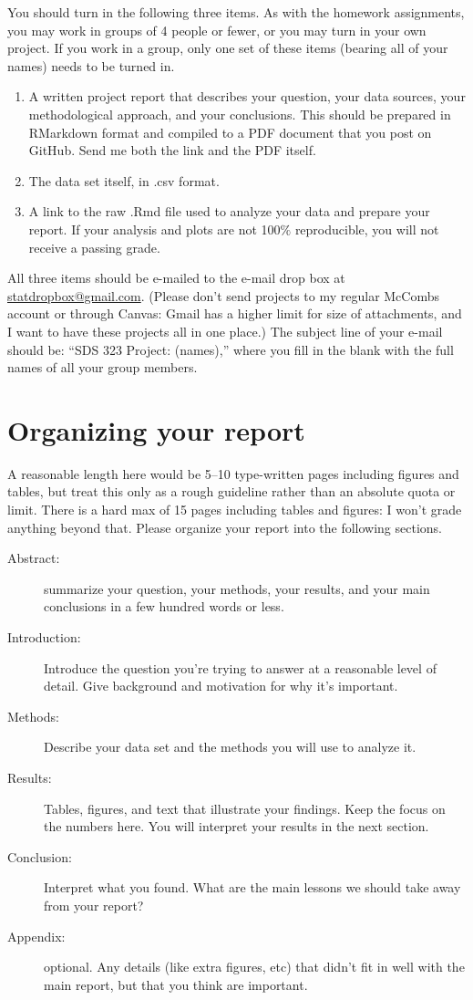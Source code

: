 \documentclass{mynotes}
\begin{document}
You should turn in the following three items.  As with the homework assignments, you may work in groups of 4 people or fewer, or you may turn in your own project.  If you work in a group, only one set of these items (bearing all of your names) needs to be turned in.
\begin{enumerate}
\item A written project report that describes your question, your data sources, your methodological approach, and your conclusions.  This should be prepared in RMarkdown format and compiled to a PDF document that you post on GitHub.  Send me both the link and the PDF itself.    
\item The data set itself, in .csv format.
\item A link to the raw .Rmd file used to analyze your data and prepare your report.  If your analysis and plots are not 100$\%$ reproducible, you will not receive a passing grade.
\end{enumerate}
All three items should be e-mailed to the e-mail drop box at \url{statdropbox@gmail.com}.  (Please don't send projects to my regular McCombs account or through Canvas: Gmail has a higher limit for size of attachments, and I want to have these projects all in one place.)  The subject line of your e-mail should be: ``SDS 323 Project: (names),'' where you fill in the blank with the full names of all your group members.


\section{Organizing your report}

A reasonable length here would be 5--10 type-written pages including figures and tables, but treat this only as a rough guideline rather than an absolute quota or limit.  There is a hard max of 15 pages including tables and figures: I won't grade anything beyond that.  Please organize your report into the following sections.
\begin{description}
\item[Abstract:] summarize your question, your methods, your results, and your main conclusions in a few hundred words or less.
\item[Introduction:] Introduce the question you're trying to answer at a reasonable level of detail.  Give background and motivation for why it's important.
\item[Methods:] Describe your data set and the methods you will use to analyze it.
\item[Results:] Tables, figures, and text that illustrate your findings.  Keep the focus on the numbers here.  You will interpret your results in the next section.
\item[Conclusion:] Interpret what you found. What are the main lessons we should take away from your report?
\item[Appendix:] optional.  Any details (like extra figures, etc) that didn't fit in well with the main report, but that you think are important.
\end{description}
\end{document}

